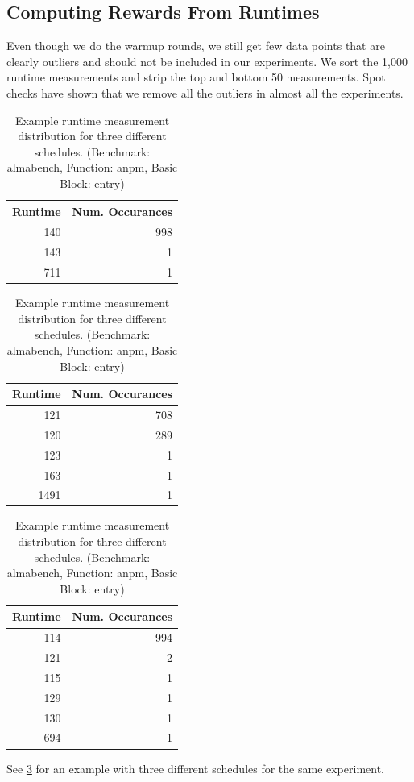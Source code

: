 \subsection{Computing Rewards From Runtimes}
\tobechecked
Even though we do the warmup rounds, we still get few data points that are clearly outliers and should not be included in our experiments.
We sort the 1,000 runtime measurements and strip the top and bottom 50 measurements.
Spot checks have shown that we remove all the outliers in almost all the experiments.
\begin{table}
    \centering
    \begin{tabular}{@{}rr@{}}
        \toprule
        Runtime & Num. Occurances \\
        \midrule
        140 & 998 \\
        143 & 1 \\
        711 & 1 \\
        \bottomrule
    \end{tabular}
    \hspace{0.8cm}
    \begin{tabular}{@{}rr@{}}
        \toprule
        Runtime & Num. Occurances \\
        \midrule
        121 & 708 \\
        120 & 289 \\
        123 & 1 \\
        163 & 1 \\
        1491 & 1 \\
        \bottomrule
    \end{tabular}
    \hspace{0.8cm}
    \begin{tabular}{@{}rr@{}}
        \toprule
        Runtime & Num. Occurances \\
        \midrule
        114 & 994 \\
        121 & 2 \\
        115 & 1 \\
        129 & 1 \\
        130 & 1 \\
        694 & 1 \\
        \bottomrule
    \end{tabular}
    \caption[Example runtime measurement distribution]{Example runtime measurement distribution for three different schedules. (Benchmark: almabench, Function: anpm, Basic Block: entry)}
    \label{tab:approach:example_runtimes}
\end{table}
See \cref{tab:approach:example_runtimes} for an example with three different schedules for the same experiment.

